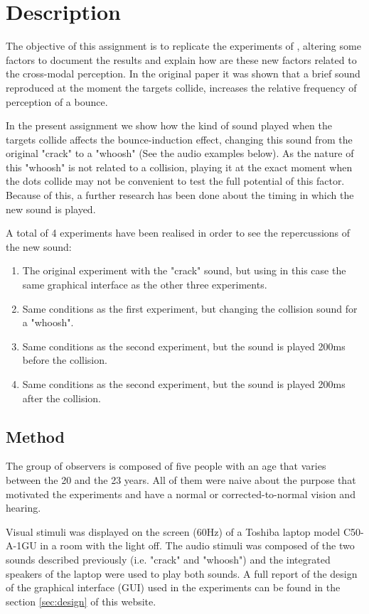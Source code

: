 \section{Description}
The objective of this assignment is to replicate the experiments of \cite{watanabe2001}, altering some factors to document the results and explain how are these new factors related to the cross-modal perception. In the original paper it was shown that a brief sound reproduced at the moment the targets collide, increases the relative frequency of perception of a bounce.

In the present assignment we show how the kind of sound played when the targets collide affects the bounce-induction effect, changing this sound from the original "crack" to a "whoosh" (See the audio examples below). As the nature of this "whoosh" is not related to a collision, playing it at the exact moment when the dots collide may not be convenient to test the full potential of this factor. Because of this, a further research has been done about the timing in which the new sound is played. 

A total of 4 experiments have been realised in order to see the repercussions of the new sound:

\begin{enumerate}
	\item The original experiment with the "crack" sound, but using in this case the same graphical interface as the other three experiments.
	\item Same conditions as the first experiment, but changing the collision sound for a "whoosh".
	\item Same conditions as the second experiment, but the sound is played 200ms before the collision.
	\item Same conditions as the second experiment, but the sound is played 200ms after the collision.
\end{enumerate}

\clearpage 

\subsection{Method}
 The group of observers is composed of five people with an age that varies between the 20 and the 23 years. All of them were naive about the purpose that motivated the experiments and have a normal or corrected-to-normal vision and hearing.

Visual stimuli was displayed on the screen (60Hz) of a Toshiba laptop model C50-A-1GU in a room with the light off. The audio stimuli was composed of the two sounds described previously (i.e. "crack" and "whoosh") and the integrated speakers of the laptop were used to play both sounds. A full report of the design of the graphical interface (GUI) used in the experiments can be found in the section \ref{sec:design} of this website.

